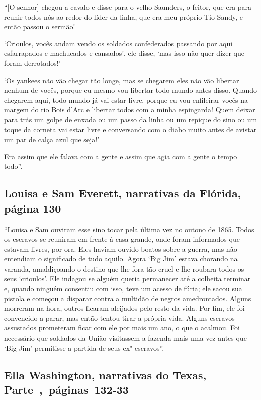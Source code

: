``{[}O senhor{]} chegou a cavalo e disse para o velho Saunders, o
feitor, que era para reunir todos nós ao redor do líder da linha, que
era meu próprio Tio Sandy, e então passou o sermão!

`Crioulos, vocês andam vendo os soldados confederados passando por aqui
esfarrapados e machucados e cansados', ele disse, `mas isso não quer
dizer que foram derrotados!'

`Os yankees não vão chegar tão longe, mas se chegarem eles não vão
libertar nenhum de vocês, porque eu mesmo vou libertar todo mundo antes
disso. Quando chegarem aqui, todo mundo já vai estar livre, porque eu
vou enfileirar vocês na margem do rio Bois d'Arc e libertar todos com a
minha espingarda! Quem deixar para trás um golpe de enxada ou um passo
da linha ou um repique do sino ou um toque da corneta vai estar livre e
conversando com o diabo muito antes de avistar um par de calça azul que
seja!'

Era assim que ele falava com a gente e assim que agia com a gente o
tempo todo''.

\subsection{Louisa e Sam Everett, narrativas da Flórida, página 130} \label{ref85}

``Louisa e Sam ouviram esse sino tocar pela última vez no outono de
1865. Todos os escravos se reuniram em frente à casa grande, onde
foram informados que estavam livres, por ora. Eles haviam ouvido boatos
sobre a guerra, mas não entendiam o significado de tudo aquilo. Agora
`Big Jim' estava chorando na varanda, amaldiçoando o destino que lhe
fora tão cruel e lhe roubara todos os seus `crioulos'. Ele indagou se
alguém queria permanecer até a colheita terminar e, quando ninguém
consentiu com isso, teve um acesso de fúria; ele sacou sua pistola e
começou a disparar contra a multidão de negros amedrontados. Alguns
morreram na hora, outros ficaram aleijados pelo resto da vida. Por fim,
ele foi convencido a parar, mas então tentou tirar a própria vida.
Alguns escravos assustados prometeram ficar com ele por mais um ano, o
que o acalmou. Foi necessário que soldados da União visitassem a fazenda
mais uma vez antes que `Big Jim' permitisse a partida de seus
ex"-escravos''.

\subsection{Ella Washington, narrativas do Texas, Parte~,~páginas~132-33}
\label{ref279}

